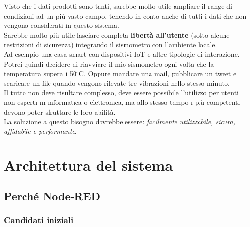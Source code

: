 \documentclass[a4paper,10pt]{memoir}
\begin{document}
Visto che i dati prodotti sono tanti, sarebbe molto utile ampliare il range di condizioni ad un più vasto campo, tenendo in conto anche di tutti i dati che non vengono considerati in questo sistema.\\
Sarebbe molto più utile lasciare completa \textbf{libertà all'utente} (sotto alcune restrizioni di sicurezza) integrando il sismometro con l'ambiente locale. 
\\
Ad esempio una casa smart con dispositivi IoT o altre tipologie di interazione. 
\\
Potrei quindi decidere di riavviare il mio sismometro ogni volta che la temperatura supera i 50$^{\circ}$C. Oppure mandare una mail, pubblicare un tweet e scaricare un file quando vengono rilevate tre vibrazioni nello stesso minuto.
\\
Il tutto non deve risultare complesso, deve essere possibile l'utilizzo per utenti non esperti in informatica o elettronica, ma allo stesso tempo i più competenti devono poter sfruttare le loro abilità.
\\
La soluzione a questo bisogno dovrebbe essere: \textit{facilmente utilizzabile, sicura, affidabile e performante}.
\clearpage

\chapter{Architettura del sistema}

\section{Perché Node-RED}

\subsection{Candidati iniziali}
\end{document}
